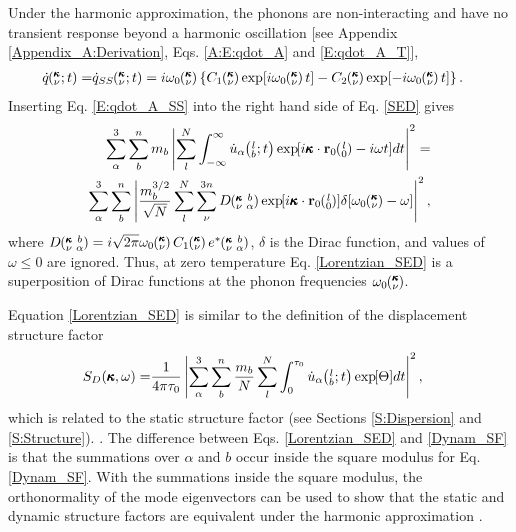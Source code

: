 Under the harmonic approximation, the phonons 
are non-interacting and have no transient response beyond a harmonic 
oscillation [see Appendix \ref{Appendix_A:Derivation},  
Eqs$.$ \eqref{A:E:qdot_A} and \eqref{E:qdot_A_T}],
\begin{equation}\label{E:qdot_A_SS}
\begin{split}
\dot{q}\kvt =& \dot{q}_{SS}\kvt = 
i\omega_0\kv\left\{C_1\kv\exp[i\omega_0\kv t]-C_2\kv
\exp[-i\omega_0\kv t]\right\}.
 \end{split}
\end{equation}
Inserting Eq$.$ \eqref{E:qdot_A_SS} into the right hand side of Eq$.$ 
\eqref{SED} gives
\begin{equation}\label{Delta_SED}
\begin{split}
\sum_\alpha^3 \sum_b^n m_b \left| \sum_l^N  \int_{-\infty}^{\infty} 
\dot{u}_{\alpha}\lbt \EXP{i\pmb{\kappa}\cdot
\mathbf{r}_0\ab{l}{0}-i\omega t} 
dt \right|^2 =& \\
\sum_\alpha^3 \sum_b^n\left| \frac{m_b^{3/2}}{\sqrt{N}} \sum_l^N 
\sum_{\nu}^{3n}  D\kvba \EXP{i\pmb{\kappa}\cdot\mathbf{r}_0\ab{l}{0}} 
\delta[ \omega_0\kv - \omega] \right|^2 ,
 \end{split}
\end{equation}
where $D\kvba = i\sqrt{2\pi} \omega_0\kv C_1\kv e^*\kvba$, $\delta$ is 
the Dirac function, and values of $\omega \le 0$ are ignored. Thus, at 
zero temperature Eq$.$ \eqref{Lorentzian_SED} is a superposition of Dirac 
functions at the phonon frequencies $\omega_0\mspace{-4.0mu}\left(\mspace{-8.0mu} \begin{smallmatrix}&\pmb{\kappa} \\&\nu\end{smallmatrix} \mspace{-3.0mu}\right)$.

Equation \eqref{Lorentzian_SED} is similar to the definition of 
the displacement structure factor
\cite{volz_molecular-dynamics_2000,horbach_high_2001,
martin-mayor_dynamical_2001,christie_vibrational_2007,
beltukov_ioffe-regel_2013}
\begin{equation}\label{Dynam_SF}
\begin{split}
S_{D}(\pmb{\kappa},\omega) = & \frac{1}{4\pi\tau_0} \left| \sum_\alpha^3 
\sum_b^n \frac{m_b}{N}
 \sum_l^N  \int_{0}^{\tau_0} \dot{u}_{\alpha}\mspace{-4.0mu}\left(\mspace{-8.0mu} \begin{smallmatrix}&l \\&b\end{smallmatrix}\mspace{-2.0mu};t\right) \exp\mspace{-5.0mu}\left[\Theta\right]\mspace{-3.0mu} dt 
\right|^2,
\end{split}
\end{equation}
which is related to the static structure factor 
\cite{biswas_vibrational_1988,feldman_thermal_1993,
allen_diffusons_1999,feldman_numerical_1999,
taraskin_determination_1999,taraskin_propagation_2000,
feldman_calculations_2002,ciliberti_brillouin_2003,
shintani_universal_2008,wyart_scaling_2010,
beltukov_ioffe-regel_2013,larkin_predicting_2013,
marruzzo_heterogeneous_2013} (see Sections \ref{S:Dispersion} 
and \ref{S:Structure}). 
\cite{beltukov_ioffe-regel_2013}. The difference between Eqs. 
\eqref{Lorentzian_SED} and \eqref{Dynam_SF} is that the 
summations over $\alpha$ and $b$ occur inside the square modulus 
for Eq. \eqref{Dynam_SF}. With the summations inside the 
square modulus, the orthonormality of the mode eigenvectors 
can be used to show that the static and dynamic 
structure factors are equivalent under the harmonic approximation 
\cite{beltukov_ioffe-regel_2013}.

